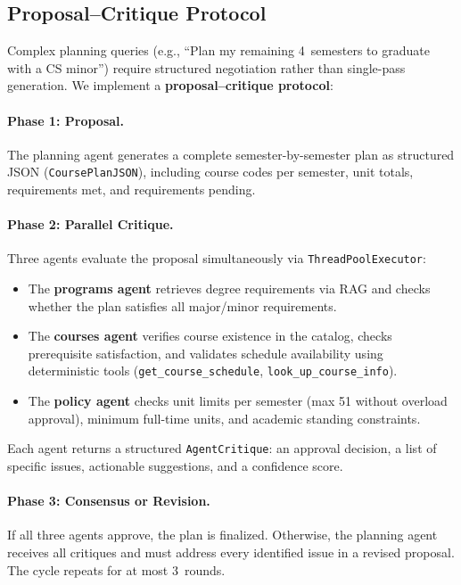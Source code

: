 \subsection{Proposal--Critique Protocol}
\label{sec:proposal-critique}

Complex planning queries (e.g., ``Plan my remaining 4~semesters to graduate with a CS minor'') require structured negotiation rather than single-pass generation. We implement a \textbf{proposal--critique protocol}:

\paragraph{Phase 1: Proposal.} The planning agent generates a complete semester-by-semester plan as structured JSON (\texttt{CoursePlanJSON}), including course codes per semester, unit totals, requirements met, and requirements pending.

\paragraph{Phase 2: Parallel Critique.} Three agents evaluate the proposal simultaneously via \texttt{ThreadPoolExecutor}:
\begin{itemize}
    \item The \textbf{programs agent} retrieves degree requirements via RAG and checks whether the plan satisfies all major/minor requirements.
    \item The \textbf{courses agent} verifies course existence in the catalog, checks prerequisite satisfaction, and validates schedule availability using deterministic tools (\texttt{get\_course\_schedule}, \texttt{look\_up\_course\_info}).
    \item The \textbf{policy agent} checks unit limits per semester (max 51 without overload approval), minimum full-time units, and academic standing constraints.
\end{itemize}

Each agent returns a structured \texttt{AgentCritique}: an approval decision, a list of specific issues, actionable suggestions, and a confidence score.

\paragraph{Phase 3: Consensus or Revision.} If all three agents approve, the plan is finalized. Otherwise, the planning agent receives all critiques and must address every identified issue in a revised proposal. The cycle repeats for at most 3~rounds.


